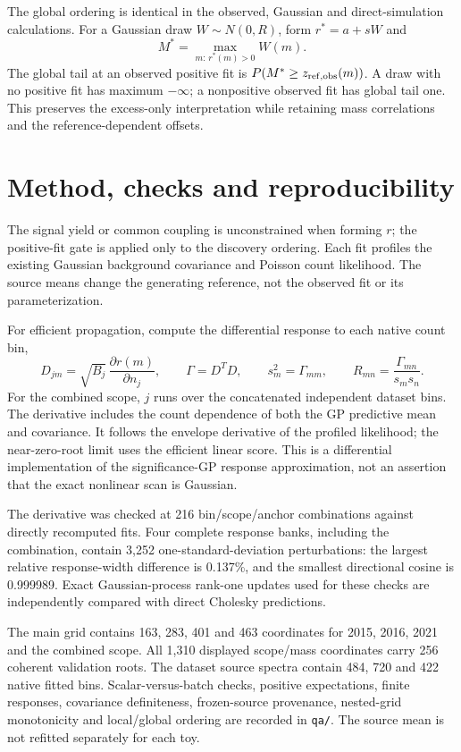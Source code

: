 \documentclass[11pt]{article}
\newcommand{\heading}[1]{\section*{\color{navy}#1}}
\begin{document}
The global ordering is identical in the observed, Gaussian and direct-simulation calculations. For a Gaussian draw $W\sim N(0,R)$, form $r^*=a+sW$ and
\[
M^*=\max_{m:\,r^*(m)>0} W(m).
\]
The global tail at an observed positive fit is $P(M^*\ge z_{\rm ref,obs}(m))$. A draw with no positive fit has maximum $-\infty$; a nonpositive observed fit has global tail one. This preserves the excess-only interpretation while retaining mass correlations and the reference-dependent offsets.

\clearpage
\heading{Method, checks and reproducibility}
The signal yield or common coupling is unconstrained when forming $r$; the positive-fit gate is applied only to the discovery ordering. Each fit profiles the existing Gaussian background covariance and Poisson count likelihood. The source means change the generating reference, not the observed fit or its parameterization.

For efficient propagation, compute the differential response to each native count bin,
\[
D_{jm}=\sqrt{B_j}\,\frac{\partial r(m)}{\partial n_j},\qquad
\Gamma=D^TD,\qquad s_m^2=\Gamma_{mm},\qquad
R_{mn}=\frac{\Gamma_{mn}}{s_ms_n}.
\]
For the combined scope, $j$ runs over the concatenated independent dataset bins. The derivative includes the count dependence of both the GP predictive mean and covariance. It follows the envelope derivative of the profiled likelihood; the near-zero-root limit uses the efficient linear score. This is a differential implementation of the significance-GP response approximation, not an assertion that the exact nonlinear scan is Gaussian.

The derivative was checked at 216 bin/scope/anchor combinations against directly recomputed fits. Four complete response banks, including the combination, contain 3,252 one-standard-deviation perturbations: the largest relative response-width difference is 0.137\%, and the smallest directional cosine is 0.999989. Exact Gaussian-process rank-one updates used for these checks are independently compared with direct Cholesky predictions.

The main grid contains 163, 283, 401 and 463 coordinates for 2015, 2016, 2021 and the combined scope. All 1,310 displayed scope/mass coordinates carry 256 coherent validation roots. The dataset source spectra contain 484, 720 and 422 native fitted bins. Scalar-versus-batch checks, positive expectations, finite responses, covariance definiteness, frozen-source provenance, nested-grid monotonicity and local/global ordering are recorded in \texttt{qa/}. The source mean is not refitted separately for each toy.
\end{document}

